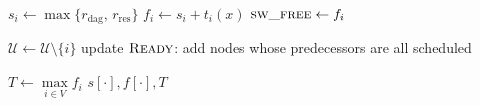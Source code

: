 \begin{algorithm}[t]
\begin{algorithmic}[1]
    \State $s_i\gets \max\{r_{\mathrm{dag}},\, r_{\mathrm{res}}\}$
    \State $f_i\gets s_i+t_i(x)$
        \State $\textsc{sw\_free}\gets f_i$
    \EndIf

    \State $\mathcal{U}\gets \mathcal{U}\setminus\{i\}$
    \State update $\textsc{Ready}$: add nodes whose predecessors are all scheduled
\EndWhile

\State $T\gets \max\limits_{i\in V} f_i$
\State \Return $s[\cdot], f[\cdot], T$
\end{algorithmic}
\end{algorithm}


